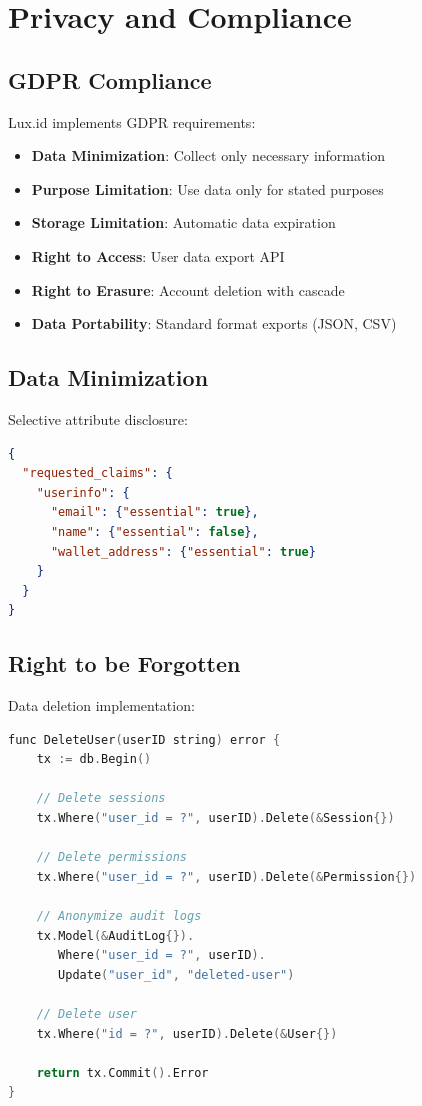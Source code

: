 \section{Privacy and Compliance}


\subsection{GDPR Compliance}

Lux.id implements GDPR requirements:

\begin{itemize}
    \item \textbf{Data Minimization}: Collect only necessary information
    \item \textbf{Purpose Limitation}: Use data only for stated purposes
    \item \textbf{Storage Limitation}: Automatic data expiration
    \item \textbf{Right to Access}: User data export API
    \item \textbf{Right to Erasure}: Account deletion with cascade
    \item \textbf{Data Portability}: Standard format exports (JSON, CSV)
\end{itemize}

\subsection{Data Minimization}

Selective attribute disclosure:

\begin{lstlisting}[language=json]
{
  "requested_claims": {
    "userinfo": {
      "email": {"essential": true},
      "name": {"essential": false},
      "wallet_address": {"essential": true}
    }
  }
}
\end{lstlisting}

\subsection{Right to be Forgotten}

Data deletion implementation:

\begin{lstlisting}[language=C]
func DeleteUser(userID string) error {
    tx := db.Begin()

    // Delete sessions
    tx.Where("user_id = ?", userID).Delete(&Session{})

    // Delete permissions
    tx.Where("user_id = ?", userID).Delete(&Permission{})

    // Anonymize audit logs
    tx.Model(&AuditLog{}).
       Where("user_id = ?", userID).
       Update("user_id", "deleted-user")

    // Delete user
    tx.Where("id = ?", userID).Delete(&User{})

    return tx.Commit().Error
}
\end{lstlisting}

